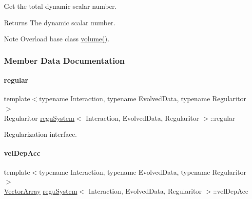 Get the total dynamic scalar number. 

\begin{DoxyReturn}{Returns}
The dynamic scalar number. 
\end{DoxyReturn}
\begin{DoxyNote}{Note}
Overload base class \mbox{\hyperlink{classregu_system_a4260b237d36d137b01504c0effd385fa}{volume()}}. 
\end{DoxyNote}


\subsubsection{Member Data Documentation}
\mbox{\label{classregu_system_a0009f79e1dbc7668e2cac4bc90332353}} 
\paragraph{\texorpdfstring{regular}{regular}}
{\footnotesize\ttfamily template$<$typename Interaction, typename Evolved\+Data, typename Regularitor$>$ \\
Regularitor \mbox{\hyperlink{classregu_system}{regu\+System}}$<$ Interaction, Evolved\+Data, Regularitor $>$\+::regular\hspace{0.3cm}{\ttfamily [private]}}



Regularization interface. 

\mbox{\label{classregu_system_a3ea004b24ff22b8cc2f79f48e96dfad3}} 
\paragraph{\texorpdfstring{vel\+Dep\+Acc}{velDepAcc}}
{\footnotesize\ttfamily template$<$typename Interaction, typename Evolved\+Data, typename Regularitor$>$ \\
\mbox{\hyperlink{classregu_system_aa4ecefb5c437230b994171e231450be8}{Vector\+Array}} \mbox{\hyperlink{classregu_system}{regu\+System}}$<$ Interaction, Evolved\+Data, Regularitor $>$\+::vel\+Dep\+Acc\hspace{0.3cm}{\ttfamily [private]}}



